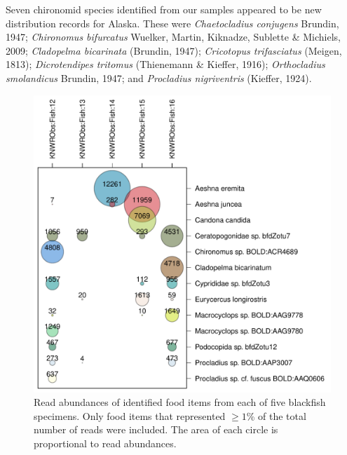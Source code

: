 \begin{multicols}{2}
Seven chironomid species identified from our samples appeared to be new distribution records for Alaska. These were 
\textit{Chaetocladius conjugens} Brundin, 1947; 
\textit{Chironomus bifurcatus} Wuelker, Martin, Kiknadze, Sublette \& Michiels, 2009; 
\textit{Cladopelma bicarinata} (Brundin, 1947);
\textit{Cricotopus trifasciatus} (Meigen, 1813);
\textit{Dicrotendipes tritomus} (Thienemann \& Kieffer, 1916);
\textit{Orthocladius smolandicus} Brundin, 1947; and
\textit{Procladius nigriventris} (Kieffer, 1924).

\end{multicols}
\begin{figure}[H]
\begin{center}
\includegraphics[width=13cm]{img/blackfish_diet_items.pdf}
\caption{Read abundances of identified food items from each of five blackfish specimens. Only food items that represented $\geq 1$\% of the total number of reads were included. The area of each circle is proportional to read abundances.}
\label{blackfish_diet_items}
\end{center}
\end{figure} 
